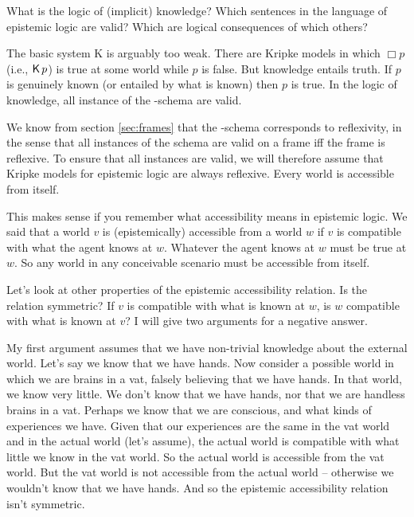 What is the logic of (implicit) knowledge? Which sentences in the language of
epistemic logic are valid? Which are logical consequences of which others?

The basic system K is arguably too weak. There are Kripke models in which
$\Box p$ (i.e., $\operatorname{\mathsf{K}{}} p$) is true at some world while $p$ is false. But knowledge entails truth.
If $p$ is genuinely known (or entailed by what is known) then $p$ is true. In
the logic of knowledge, all instance of the -schema are valid.
%

We know from section \ref{sec:frames} that the -schema corresponds to
reflexivity, in the sense that all instances of the schema are valid on a frame
iff the frame is reflexive. To ensure that all  instances are valid, we
will therefore assume that Kripke models for epistemic logic are always reflexive.
Every world is accessible from itself.

This makes sense if you remember what accessibility means in epistemic logic. We
said that a world $v$ is (epistemically) accessible from a world $w$ if $v$ is
compatible with what the agent knows at $w$. Whatever the agent knows at $w$
must be true at $w$. So any world in any conceivable scenario must be
accessible from itself.


Let's look at other properties of the epistemic accessibility relation. Is the
relation symmetric? If $v$ is compatible with what is known at $w$, is $w$
compatible with what is known at $v$? I will give two arguments for a negative
answer.

My first argument assumes that we have non-trivial knowledge about the external
world. Let's say we know that we have hands. Now consider a possible world in
which we are brains in a vat, falsely believing that we have hands. In that
world, we know very little. We don't know that we have hands, nor that we are
handless brains in a vat. Perhaps we know that we are conscious, and what kinds
of experiences we have. Given that our experiences are the same in the vat world
and in the actual world (let's assume), the actual world is compatible with what
little we know in the vat world. So the actual world is accessible from the vat
world. But the vat world is not accessible from the actual world -- otherwise we
wouldn't know that we have hands. And so the epistemic
accessibility relation isn't symmetric.

